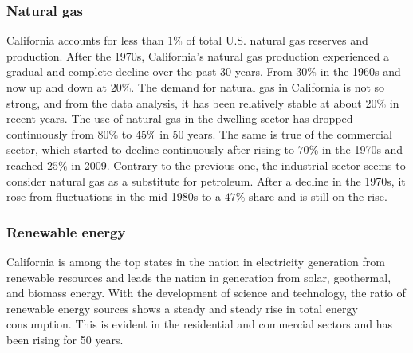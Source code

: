 \documentclass{mcmthesis}
\begin{document}
\subsubsection{Natural gas}
  California accounts for less than $1\%$ of total U.S. natural gas reserves and production.
  After the 1970s, California's natural gas production experienced a gradual and complete decline over the past 30 years.
  From $30\%$ in the 1960s and now up and down at $20\%$.
  The demand for natural gas in California is not so strong, and from the data analysis, it has been relatively stable at about $20\%$ in recent years.
  The use of natural gas in the dwelling sector has dropped continuously from $80\%$ to $45\%$ in 50 years.
  The same is true of the commercial sector, which started to decline continuously after rising to $70\%$ in the 1970s and reached $25\%$ in 2009.
  Contrary to the previous one, the industrial sector seems to consider natural gas as a substitute for petroleum.
  After a decline in the 1970s, it rose from fluctuations in the mid-1980s to a $47\%$ share and is still on the rise.
\subsubsection{Renewable energy}
  California is among the top states in the nation in electricity generation from renewable resources and leads the nation in generation from solar, geothermal, and biomass energy.
  With the development of science and technology, the ratio of renewable energy sources shows a steady and steady rise in total energy consumption.
  This is evident in the residential and commercial sectors and has been rising for 50 years.
\end{document}
